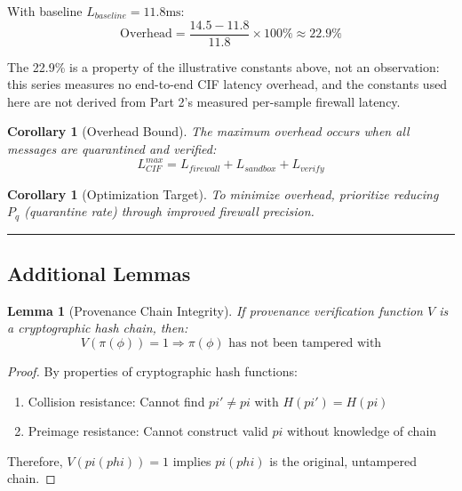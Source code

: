 \documentclass[
]{article}
\newtheorem{lemma}[theorem]{Lemma}
\newtheorem{corollary}[theorem]{Corollary}
\begin{document}
With baseline \(L_{baseline} = 11.8\text{ms}\): \begin{equation}
\label{eq:overhead-percent}
\text{Overhead} = \frac{14.5 - 11.8}{11.8} \times 100\% \approx 22.9\%
\end{equation}

The 22.9\% is a property of the illustrative constants above, not an
observation: this series measures no end-to-end CIF latency overhead,
and the constants used here are not derived from Part 2's measured
per-sample firewall latency.

\begin{corollary}[Overhead Bound]
\label{cor:overhead-bound}
The maximum overhead occurs when all messages are quarantined and verified:
\begin{equation}
\label{eq:max-overhead}
L_{CIF}^{max} = L_{firewall} + L_{sandbox} + L_{verify}
\end{equation}
\end{corollary}

\begin{corollary}[Optimization Target]
\label{cor:optimization-target}
To minimize overhead, prioritize reducing $P_q$ (quarantine rate) through improved firewall precision.
\end{corollary}

\begin{center}\rule{0.5\linewidth}{0.5pt}\end{center}

\subsection{Additional Lemmas}\label{sec:additional-lemmas}

\begin{lemma}[Provenance Chain Integrity]
\label{lem:provenance-chain}
If provenance verification function $V$ is a cryptographic hash chain, then:
\begin{equation}
\label{eq:provenance-chain}
V(\pi(\phi)) = 1 \Rightarrow \pi(\phi) \text{ has not been tampered with}
\end{equation}
\end{lemma}

\begin{proof}
By properties of cryptographic hash functions:
\begin{enumerate}
\item Collision resistance: Cannot find $pi' \neq pi$ with $H(pi') = H(pi)$
\item Preimage resistance: Cannot construct valid $pi$ without knowledge of chain
\end{enumerate}

Therefore, $V(pi(phi)) = 1$ implies $pi(phi)$ is the original, untampered chain.
\end{proof}
\end{document}

